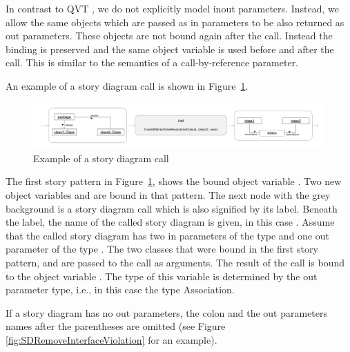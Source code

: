 In contrast to QVT \cite{QVT}, we do not explicitly model inout parameters. Instead, we allow the same objects which are passed as in parameters to be also returned as out parameters.
These objects are not bound again after the call. Instead the binding is preserved and the same object variable is used before and after the call. This is similar to the semantics of a call-by-reference parameter.

An example of a story diagram call is shown in Figure~\ref{fig:call}.

\begin{figure}[htb]
\begin{center}
  \includegraphics[width=\textwidth]{figures/StoryDiagramCall}
  \caption{Example of a story diagram call}
  \label{fig:call}
\end{center}
\end{figure}

The first story pattern in Figure~\ref{fig:call}, shows the bound object variable . Two new object variables  and  are bound in that pattern. The next node with the grey background is a story diagram call which is also signified by its label. Beneath the label, the name of the called story diagram is given, in this case . Assume that the called story diagram has two in parameters of the type  and one out parameter of the type . The two classes that were bound in the first story pattern,  and  are passed to the call as arguments.
The result of the call is bound to the object variable . The type of this variable is determined by the out parameter type, i.e., in this case the type Association.

If a story diagram has no out parameters, the colon and the out parameters names after the parentheses are omitted (see Figure \ref{fig:SDRemoveInterfaceViolation} for an example).




